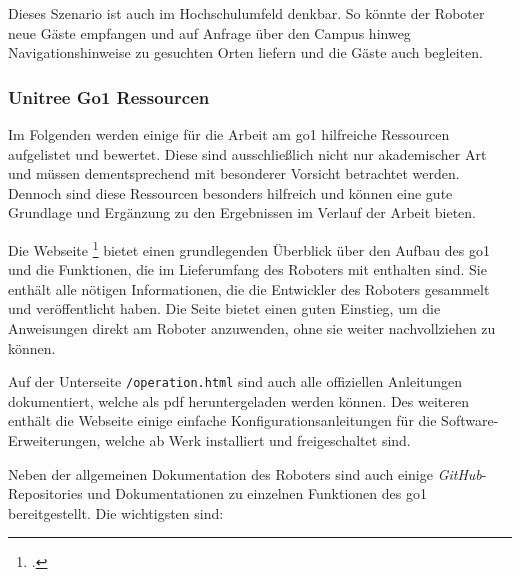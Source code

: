 Dieses Szenario ist auch im Hochschulumfeld denkbar.
So könnte der Roboter neue Gäste empfangen und auf Anfrage über den Campus hinweg Navigationshinweise zu gesuchten Orten liefern und die Gäste auch begleiten.

\subsubsection{Unitree Go1 Ressourcen}
\label{subsubsec:ressourcen}

Im Folgenden werden einige für die Arbeit am \gls{go1} hilfreiche Ressourcen aufgelistet und bewertet.
Diese sind ausschließlich nicht nur akademischer Art und müssen dementsprechend mit besonderer Vorsicht betrachtet werden.
Dennoch sind diese Ressourcen besonders hilfreich und können eine gute Grundlage und Ergänzung zu den Ergebnissen im Verlauf der Arbeit bieten.

Die Webseite \footcite{unitree_tutorials} bietet einen grundlegenden Überblick über den Aufbau
des \gls{go1} und die Funktionen, die im Lieferumfang des Roboters mit enthalten sind.
Sie enthält alle nötigen Informationen, die die Entwickler des Roboters gesammelt und veröffentlicht haben.
Die Seite bietet einen guten Einstieg, um die Anweisungen direkt am Roboter anzuwenden, ohne sie weiter nachvollziehen zu können.

Auf der Unterseite \texttt{/operation.html} sind auch alle offiziellen Anleitungen dokumentiert, welche als \gls{pdf} heruntergeladen
werden können.
Des weiteren enthält die Webseite einige einfache Konfigurationsanleitungen für die Software-Erweiterungen, welche ab
Werk installiert und freigeschaltet sind.

Neben der allgemeinen Dokumentation des Roboters sind auch einige \emph{GitHub}-Repositories und Dokumentationen zu einzelnen
Funktionen des \gls{go1} bereitgestellt.
Die wichtigsten sind:

